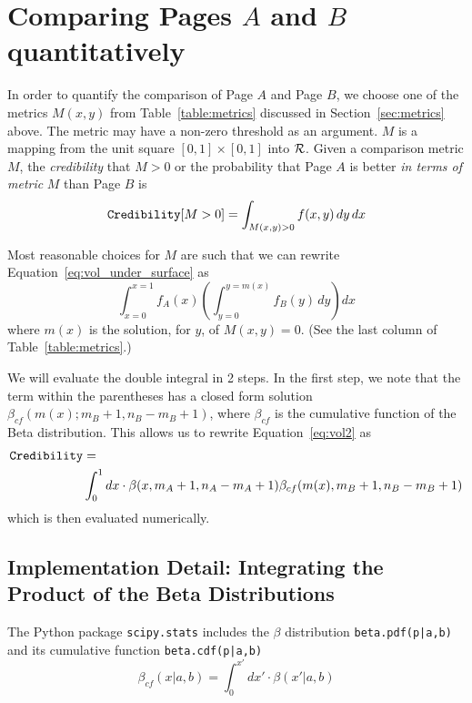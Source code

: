 \documentclass[letterpaper,12pt]{article}
\begin{document}
\section{Comparing Pages \(A\) and \(B\) quantitatively}
\label{sec:quantifying_comparison}
In order to quantify the comparison of Page \(A\) and Page \(B\), we
choose one of the metrics \(M(x, y)\) from Table~\ref{table:metrics}
discussed in Section~\ref{sec:metrics} above. The metric may have a
non-zero threshold as an argument.  \(M\) is a mapping from the unit
square \([0,1] \times [0, 1]\) into \(\cal{R}\).  Given a comparison
metric \(M\), the {\em credibility} that \(M>0\) or the probability
that Page \(A\) is better {\em in terms of metric} \(M\) than Page
\(B\) is
\begin{equation}
\label{eq:vol_under_surface}
{\tt Credibility}[M>0]=\int_{M(x,y) >0} f(x, y)\,  dy \, dx
\end{equation}

Most reasonable choices for \(M\) are such that we can rewrite
Equation~\ref{eq:vol_under_surface} as 
\begin{equation}
\label{eq:vol2}
\int_{x=0}^{x=1} f_A(x) \left( \int_{y=0}^{y=m(x)} f_B(y)\,  dy\right) dx
\end{equation}
where \(m(x)\) is
the solution, for \(y\), of \(M(x, y) = 0\). (See the last column of
Table~\ref{table:metrics}.)

We will evaluate the double integral in 2 steps.  In the first step,
we note that the term within the parentheses has a closed form
solution \(\beta_{cf}(m(x); m_B+1, n_B-m_B+1)\), where \(\beta_{cf}\)
is the cumulative function of the Beta distribution. This allows
us to rewrite Equation~\ref{eq:vol2} as
\begin{equation}
  \label{eq:vol3}
  \begin{split}
    {\tt Credibility} &= \\
    &\int_0^1dx\cdot \beta(x,m_A+1, n_A-m_A+1) \beta_{cf}(m(x), m_B+1, n_B-m_B+1)
  \end{split}
\end{equation}
which is then evaluated numerically.

\subsection{Implementation Detail: Integrating the Product of the Beta Distributions}\label{sec:implementation}
The Python package {\tt scipy.stats} includes the \(\beta\) distribution
{\tt beta.pdf(p|a,b)} and its cumulative function {\tt beta.cdf(p|a,b)}
  \begin{equation}
  \label{eq:beta_cf}
  \beta_{cf}(x|a,b) = \int_0^{x'}dx'\cdot\beta(x'|a,b)
  \end{equation}
\end{document}
